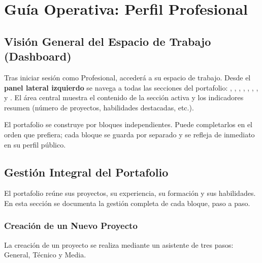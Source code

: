 \chapter{Guía Operativa: Perfil Profesional}
\label{ch:profesional}

\section{Visión General del Espacio de Trabajo (Dashboard)}
\label{sec:prof-dashboard}
Tras iniciar sesión como Profesional, accederá a su espacio de trabajo. Desde el
\textbf{panel lateral izquierdo} se navega a todas las secciones del portafolio:
, , , ,
, , ,  y
. El área central muestra el contenido de la sección activa y los
indicadores resumen (número de proyectos, habilidades destacadas, etc.).

\begin{AvisoNota}
El portafolio se construye por bloques independientes. Puede completarlos en el orden
que prefiera; cada bloque se guarda por separado y se refleja de inmediato en su perfil
público.
\end{AvisoNota}

\section{Gestión Integral del Portafolio}
\label{sec:prof-portafolio}
El portafolio reúne sus proyectos, su experiencia, su formación y sus habilidades. En
esta sección se documenta la gestión completa de cada bloque, paso a paso.

\subsection{Creación de un Nuevo Proyecto}
\label{subsec:prof-crear-proyecto}
La creación de un proyecto se realiza mediante un asistente de tres pasos: General,
Técnico y Media.

